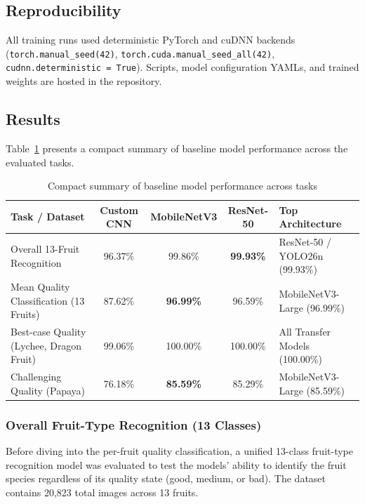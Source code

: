 \documentclass[11pt,a4paper]{article}
\begin{document}
\subsection{Reproducibility}
All training runs used deterministic PyTorch and cuDNN backends (\texttt{torch.manual\_seed(42)}, \texttt{torch.cuda.manual\_seed\_all(42)}, \texttt{cudnn.deterministic = True}). Scripts, model configuration YAMLs, and trained weights are hosted in the repository.

\subsection{Results}
Table~\ref{tab:baseline-summary-compact} presents a compact summary of baseline model performance across the evaluated tasks.

\begin{table}[H]
\centering\small
\begin{tabularx}{\textwidth}{|p{}|c|c|c|X|}
\hline
\textbf{Task / Dataset} & \textbf{Custom CNN} & \textbf{MobileNetV3} & \textbf{ResNet-50} & \textbf{Top Architecture} \\
\hline
Overall 13-Fruit Recognition & 96.37\% & 99.86\% & \textbf{99.93\%} & ResNet-50 / YOLO26n (99.93\%) \\ \hline
Mean Quality Classification (13 Fruits) & 87.62\% & \textbf{96.99\%} & 96.59\% & MobileNetV3-Large (96.99\%) \\ \hline
Best-case Quality (Lychee, Dragon Fruit) & 99.06\% & 100.00\% & 100.00\% & All Transfer Models (100.00\%) \\ \hline
Challenging Quality (Papaya) & 76.18\% & \textbf{85.59\%} & 85.29\% & MobileNetV3-Large (85.59\%) \\ \hline
\end{tabularx}
\caption{Compact summary of baseline model performance across tasks}
\label{tab:baseline-summary-compact}
\end{table}

\subsubsection{Overall Fruit-Type Recognition (13 Classes)}
Before diving into the per-fruit quality classification, a unified 13-class fruit-type recognition model was evaluated to test the models' ability to identify the fruit species regardless of its quality state (good, medium, or bad). The dataset contains 20{,}823 total images across 13 fruits.
\end{document}
